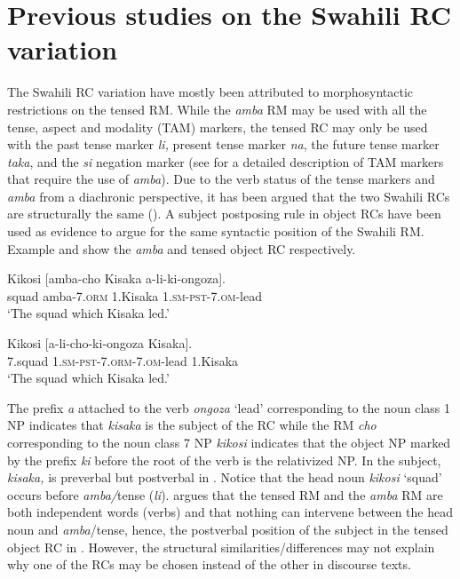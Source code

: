 \documentclass[output=paper,colorlinks,citecolor=brown]{langscibook}
\begin{document}
\section{Previous studies on the Swahili RC variation}\label{sec:mwamzandi:2}

The Swahili RC variation have mostly been attributed to morphosyntactic restrictions on the tensed RM. While the \textit{amba} RM may be used with all the tense, aspect and modality (TAM) markers, the tensed RC may only be used with the past tense marker \textit{li,} present tense marker \textit{na}, the future tense marker \textit{taka}, and the \textit{si} negation marker (see \citealt{Keach1985} for a detailed description of TAM markers that require the use of \textit{amba}). Due to the verb status of the tense markers and \textit{amba} from a diachronic perspective, it has been argued that the two Swahili RCs are structurally the same (\citealt{Vitale1981, Keach1985, DemuthHarford1999, Ngonyani2001, Ngonyani2006}). A subject postposing rule in object RCs have been used as evidence to argue for the same syntactic position of the Swahili RM. Example  and  show the \textit{amba} and tensed object RC respectively.

\ea%
    \label{ex:mwamzandi:6}
    \gll    Kikosi [amba-cho Kisaka a-li-ki-ongoza].\\
            squad  amba\textsc{-7.orm}  1.Kisaka  \textsc{1.sm-pst-7.om-}lead\\
    \glt    ‘The squad which Kisaka led.’
\z

\ea%
    \label{ex:mwamzandi:7}
    \gll    Kikosi  [a-li-cho-ki-ongoza Kisaka].\\
            7.squad  \textsc{1.sm-pst-7.orm-7.om-}lead  1.Kisaka\\
    \glt    ‘The squad which Kisaka led.’
\z

The prefix \textit{a} attached to the verb \textit{ongoza} ‘lead’ corresponding to the noun class 1 NP indicates that \textit{kisaka} is the subject of the RC while the RM \textit{cho} corresponding to the noun class 7 NP \textit{kikosi} indicates that the object NP marked by the prefix \textit{ki} before the root of the verb is the relativized NP. In  the subject, \textit{kisaka,} is preverbal but postverbal in . Notice that the head noun \textit{kikosi} ‘squad’ occurs before \textit{amba/}tense (\textit{li}). \citet{Keach1985} argues that the tensed RM and the \textit{amba} RM are both independent words (verbs) and that nothing can intervene between the head noun and \textit{amba}/tense, hence, the postverbal position of the subject in the tensed object RC in . However, the structural similarities/differences may not explain why one of the RCs may be chosen instead of the other in discourse texts. 
\end{document}
